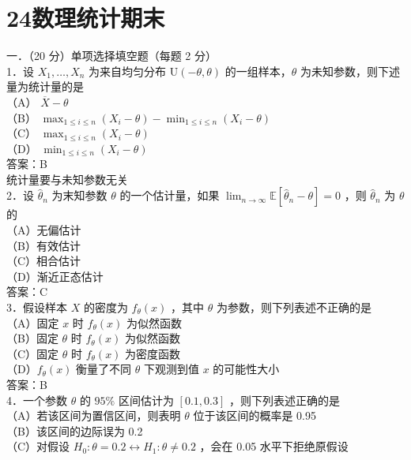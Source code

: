 \documentclass[UTF8,openany]{book}
\begin{document}
	\section{\centering 24数理统计期末}
	\noindent 一．（20 分）单项选择填空题（每题 2 分）\\
	1．设 $X_1, \ldots, X_n$ 为来自均匀分布 $\mathrm{U}(-\theta, \theta)$ 的一组样本，$\theta$ 为未知参数，则下述量为统计量的是\underline{\hspace{2cm}}\\
	（A） $\overline{X}-\theta$\\
	（B） $\max _{1 \leq i \leq n}\left(X_i-\theta\right)-\min _{1 \leq i \leq n}\left(X_i-\theta\right)$\\
	（C） $\max _{1 \leq i \leq n}\left(X_i-\theta\right)$\\
	（D） $\min _{1 \leq i \leq n}\left(X_i-\theta\right)$\\
	答案：B\\
	统计量要与未知参数无关\\
	2．设 $\hat{\theta}_n$ 为末知参数 $\theta$ 的一个估计量，如果 $\lim _{n \rightarrow \infty} \mathbb{E}\left[ \hat{\theta}_n-\theta\right] =0$ ，则 $\hat{\theta}_n$ 为 $\theta$ 的\underline{\hspace{2cm}}\\
	（A）无偏估计\\
	（B）有效估计\\
	（C）相合估计\\
	（D）渐近正态估计\\
	答案：C\\
	3．假设样本 $X$ 的密度为 $f_\theta(x)$ ，其中 $\theta$ 为参数，则下列表述不正确的是\underline{\hspace{2cm}}\\
	（A）固定 $x$ 时 $f_\theta(x)$ 为似然函数\\
	（B）固定 $\theta$ 时 $f_\theta(x)$ 为似然函数\\
	（C）固定 $\theta$ 时 $f_\theta(x)$ 为密度函数\\
	（D）$f_\theta(x)$ 衡量了不同 $\theta$ 下观测到值 $x$ 的可能性大小\\
	答案：B\\
	4．一个参数 $\theta$ 的 $95 \%$ 区间估计为 $[0.1,0.3]$ ，则下列表述正确的是\underline{\hspace{2cm}}\\
	（A）若该区间为置信区间，则表明 $\theta$ 位于该区间的概率是 0.95\\
	（B）该区间的边际误为 0.2\\
	（C）对假设 $H_0: \theta=0.2 \leftrightarrow H_1: \theta \neq 0.2$ ，会在 0.05 水平下拒绝原假设\\
\end{document}
